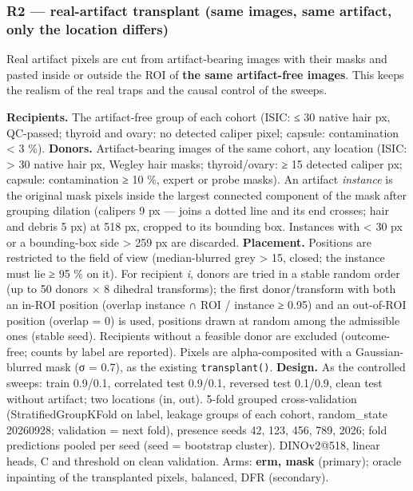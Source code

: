 {\subsubsection{R2 --- real-artifact transplant (same images, same artifact, only the location differs)}\label{r2--real-artifact-transplant-same-images-same-artifact-only-the-location-differs}

Real artifact pixels are cut from artifact-bearing images with their masks and pasted inside or outside the ROI of
\textbf{the same artifact-free images}. This keeps the realism of the real traps and the causal control of the sweeps.

\textbf{Recipients.} The artifact-free group of each cohort (ISIC: ≤ 30 native hair px, QC-passed; thyroid and ovary:
no detected caliper pixel; capsule: contamination \textless{} 3 \%).
\textbf{Donors.} Artifact-bearing images of the same cohort, any location (ISIC: \textgreater{} 30 native hair px, Wegley hair
masks; thyroid/ovary: ≥ 15 detected caliper px; capsule: contamination ≥ 10 \%, expert or probe masks). An artifact
\emph{instance} is the original mask pixels inside the largest connected component of the mask after grouping dilation
(calipers 9 px --- joins a dotted line and its end crosses; hair and debris 5 px) at 518 px, cropped to its bounding
box. Instances with \textless{} 30 px or a bounding-box side \textgreater{} 259 px are discarded.
\textbf{Placement.} Positions are restricted to the field of view (median-blurred grey \textgreater{} 15, closed; the instance must
lie ≥ 95 \% on it). For recipient \emph{i}, donors are tried in a stable random order (up to 50 donors × 8 dihedral
transforms); the first donor/transform with both an in-ROI position (overlap \textbar instance ∩ ROI\textbar{} / \textbar instance\textbar{} ≥ 0.95)
and an out-of-ROI position (overlap = 0) is used, positions drawn at random among the admissible ones (stable seed).
Recipients without a feasible donor are excluded (outcome-free; counts by label are reported). Pixels are
alpha-composited with a Gaussian-blurred mask (σ = 0.7), as the existing \texttt{transplant()}.
\textbf{Design.} As the controlled sweeps: train 0.9/0.1, correlated test 0.9/0.1, reversed test 0.1/0.9, clean test
without artifact; two locations (in, out). 5-fold grouped cross-validation (StratifiedGroupKFold on label, leakage
groups of each cohort, random\_state 20260928; validation = next fold), presence seeds 42, 123, 456, 789, 2026;
fold predictions pooled per seed (seed = bootstrap cluster). DINOv2@518, linear heads, C and threshold on clean
validation. Arms: \textbf{erm, mask} (primary); oracle inpainting of the transplanted pixels, balanced, DFR (secondary).

}
